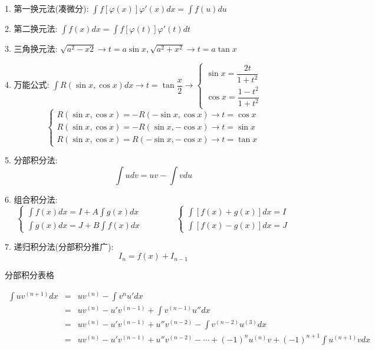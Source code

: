 \begin{definition}[积分方法]
	1. 第一换元法(凑微分): $\int f[\varphi(x)]\varphi'(x)dx = \int f(u)du$

	2. 第二换元法: $\int f(x)dx = \int f[\varphi(t)]\varphi'(t)dt$

	3. 三角换元法: $\sqrt{a^{2}-x{2}}\to t = a\sin x, \sqrt{a^{2}+x^{2}}\to t = a\tan x$

	4. 万能公式: $\int R(\sin x, \cos x)dx \to t = \tan \dfrac{x}{2}\to \begin{cases} \sin x = \dfrac{2t}{1+t^{2}}\\ \cos x = \dfrac{1-t^{2}}{1+t^{2}}\end{cases}$
	$$\begin{cases} R(\sin x,\cos x) = -R(-\sin x,\cos x)\to t =\cos x\\ 
		R(\sin x,\cos x) = -R(\sin x,-\cos x)\to t = \sin x\\
		R(\sin x,\cos x) = R(-\sin x,-\cos x)\to t = \tan x
	\end{cases}$$

	5. 分部积分法:
	$$\int udv = uv - \int vdu$$

	
	6. 组合积分法: 
	$$\begin{cases} \int f(x)dx = I + A\int g(x)dx  \\ \int g(x) dx= J + B\int f(x)dx \end{cases}\qquad\qquad \begin{cases} \int [f(x) + g(x)]dx = I \\ \int [f(x)-g(x)]dx =J  \end{cases}$$

	7. 递归积分法(分部积分推广): 
	$$I_{n} = f(x) + I_{n-1}$$
\end{definition}
\begin{table}[ht]
	\centering
	\caption{分部积分表格}
	\label{table: 分部积分表格法}
\end{table}
\begin{theorem}
	\begin{eqnarray*}
		\int uv^{(n+1)}dx &=& uv^{(n)} - \int v^{n}u'dx \\
			              &=& uv^{(n)} - u'v^{(n-1)} + \int v^{(n-1)}u''dx\\
			              &=& uv^{(n)} - u'v^{(n-1)} +  u''v^{(n-2)} -\int v^{(n-2)}u^{(3)}dx\\
			              &=& uv^{(n)} - u'v^{(n-1)} +  u''v^{(n-2)} -\cdots + (-1)^{n}u^{(n)}v + (-1)^{n+1}\int u^{(n+1)}vdx
	\end{eqnarray*}
\end{theorem}
